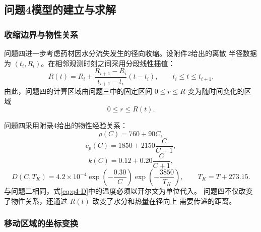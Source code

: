 \documentclass[12pt,a4paper]{article}
\begin{document}
\subsection{问题4模型的建立与求解}

\subsubsection{收缩边界与物性关系}

问题四进一步考虑药材因水分流失发生的径向收缩。设附件2给出的离散
半径数据为 $(t_i,R_i)$。在相邻观测时刻之间采用分段线性插值：
\begin{equation}
R(t)=R_i+
\frac{R_{i+1}-R_i}{t_{i+1}-t_i}(t-t_i),
\qquad t_i\leq t\leq t_{i+1}.
\label{eq:q4-radius}
\end{equation}
由此，问题四的计算区域由问题三中的固定区间 $0\leq r\leq R$
变为随时间变化的区域
\begin{equation}
0\leq r\leq R(t).
\label{eq:q4-moving-domain}
\end{equation}

问题四采用附录4给出的物性经验关系：
\begin{equation}
\rho(C)=760+90C,
\label{eq:q4-rho}
\end{equation}
\begin{equation}
c_p(C)=1850+2150\frac{C}{C+1},
\label{eq:q4-cp}
\end{equation}
\begin{equation}
k(C)=0.12+0.20\frac{C}{C+1},
\label{eq:q4-k}
\end{equation}
\begin{equation}
D(C,T_K)=4.2\times10^{-4}
\exp\left(-\frac{0.30}{C}\right)
\exp\left(-\frac{3850}{T_K}\right),
\qquad T_K=T+273.15.
\label{eq:q4-D}
\end{equation}
与问题二相同，式\eqref{eq:q4-D}中的温度必须以开尔文为单位代入。
问题四不仅改变了物性关系，还通过 $R(t)$ 改变了水分和热量在径向上
需要传递的距离。

\subsubsection{移动区域的坐标变换}
\end{document}
